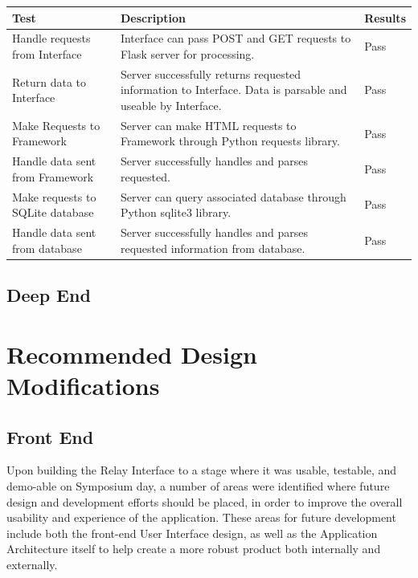 \documentclass{report}
\begin{document}
\begin{longtable}[H] {| P{3.5cm} | P{10cm} | P{1.5cm} |}
    \hline
    Test                             & Description                                                                                                 & Results \\ \hline
    Handle requests from Interface   &  Interface can pass POST and GET requests to Flask server for processing.                                   & Pass    \\ \hline
    Return data to Interface         &  Server successfully returns requested information to Interface. Data is parsable and useable by Interface. & Pass    \\ \hline
    Make Requests to Framework       &  Server can make HTML requests to Framework through Python requests library.                                & Pass    \\ \hline
    Handle data sent from Framework  &  Server successfully handles and parses requested.                                                          & Pass    \\ \hline
    Make requests to SQLite database &  Server can query associated database through Python sqlite3 library.                                       & Pass    \\ \hline
    Handle data sent from database   &  Server successfully handles and parses requested information from database.                                &  Pass   \\ \hline
\end{longtable}

\section{Deep End}

\newpage
\chapter{Recommended Design Modifications}

\section{Front End}
Upon building the Relay Interface to a stage where it was usable, testable, and demo-able on Symposium day, a number of areas were identified where future design and development efforts should be placed, in order to improve the overall usability and experience of the application.
These areas for future development include both the front-end User Interface design, as well as the Application Architecture itself to help create a more robust product both internally and externally.
\end{document}
